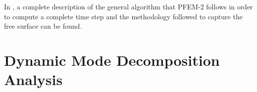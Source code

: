 \documentclass[a4paper,conference]{IEEEtran}
\newcommand{\vv}{\mathbf{v}}
\begin{document}
%


In \cite{gimenezgonzalez2014,Gimenez2015186}, a complete description of the general algorithm that PFEM-2 follows in order to compute a complete time step and the methodology followed to capture the free surface can be found.

\section{Dynamic Mode Decomposition Analysis}



\end{document}
